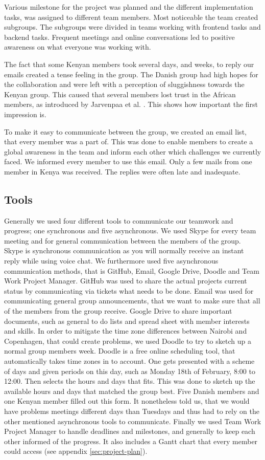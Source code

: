 Various milestone for the project was planned and the different implementation tasks, was assigned to different team members. Most noticeable the team created subgroups. The subgroups were divided in teams working with frontend tasks and backend tasks. Frequent meetings and online conversations led to positive awareness \cite{leinonen2005conceptualizing} on what everyone was working with.

The fact that some Kenyan members took several days, and weeks, to reply our emails created a tense feeling in the group. The Danish group had high hopes for the collaboration and were left with a perception of sluggishness towards the Kenyan group. This caused that several members lost trust in the African members, as introduced by Jarvenpaa et al. \cite{jarvenpaa1998communication}. This shows how important the first impression is.

To make it easy to communicate between the group, we created an email list, that every member was a part of. This was done to enable members to create a global awareness in the team and inform each other which challenges we currently faced. We informed every member to use this email. Only a few mails from one member in Kenya was received. The replies were often late and inadequate.

\subsection{Tools} \label{sec:tools}
Generally we used four different tools to communicate our teamwork and progress; one synchronous and five asynchronous. We used Skype for every team meeting and for general communication between the members of the group. Skype is synchronous communication as you will normally receive an instant reply while using voice chat. We furthermore used five asynchronous communication methods, that is GitHub, Email, Google Drive, Doodle and Team Work Project Manager. GitHub was used to share the actual projects current status by communicating via tickets what needs to be done. Email was used for communicating general group announcements, that we want to make sure that all of the members from the group receive. Google Drive to share important documents, such as general to do lists and spread sheet with member interests and skills. In order to mitigate the time zone differences between Nairobi and Copenhagen, that could create problems, we used Doodle to try to sketch up a normal group members week. Doodle is a free online scheduling tool, that automatically takes time zones in to account. One gets presented with a scheme of days and given periods on this day, such as Monday 18th of February, 8:00 to 12:00. Then selects the hours and days that fits. This was done to sketch up the available hours and days that matched the group best. Five Danish members and one Kenyan member filled out this form. It nonetheless told us, that we would have problems meetings different days than Tuesdays and thus had to rely on the other mentioned asynchronous tools to communicate. Finally we used Team Work Project Manager to handle deadlines and milestones, and generally to keep each other informed of the progress. It also includes a Gantt chart that every member could access (see appendix \ref{sec:project-plan}).

